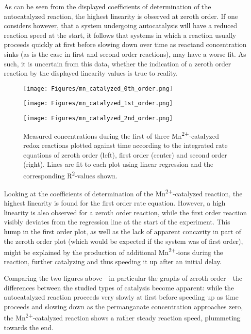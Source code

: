 \documentclass[titlepage]{article}
\begin{document}
%
\noindent As can be seen from the displayed coefficients of determination of the autocatalyzed reaction, the highest linearity is observed at zeroth order. If one considers however, that a system undergoing autocatalysis will have a reduced reaction speed at the start, it follows that systems in which a reaction usually proceeds quickly at first before slowing down over time as reactand concentration sinks (as is the case in first and second order reactions), may have a worse fit. As such, it is uncertain from this data, whether the indication of a zeroth order reaction by the displayed linearity values is true to reality.
%
\begin{figure}[H]
    \centering
    \begin{minipage}[c]{0.32\textwidth}
        \texttt{[image: Figures/mn\_catalyzed\_0th\_order.png]}
    \end{minipage}
    \begin{minipage}[c]{0.32\textwidth}
        \texttt{[image: Figures/mn\_catalyzed\_1st\_order.png]}
    \end{minipage}
    \begin{minipage}[c]{0.32\textwidth}
        \texttt{[image: Figures/mn\_catalyzed\_2nd\_order.png]}
    \end{minipage}
    \caption{Measured concentrations during the first of three Mn\textsuperscript{2+}-catalyzed redox reactions plotted against time according to the integrated rate equations of zeroth order (left), first order (center) and second order (right). Lines are fit to each plot using linear regression and the corresponding R\textsuperscript{2}-values shown.}
    \label{fig_kmno_mn_catalyzed_rates}
\end{figure}
%
\noindent Looking at the coefficients of determination of the Mn\textsuperscript{2+}-catalyzed reaction, the highest linearity is found for the first order rate equation. However, a high linearity is also observed for a zeroth order reaction, while the first order reaction visibly deviates from the regression line at the start of the experiment. This hump in the first order plot, as well as the lack of apparent concavity in part of the zeroth order plot (which would be expected if the system was of first order), might be explained by the production of additional Mn\textsuperscript{2+}-ions during the reaction, further catalyzing and thus speeding it up after an initial delay.

Comparing the two figures above - in particular the graphs of zeroth order - the differences between the studied types of catalysis become apparent: while the autocatalyzed reaction proceeds very slowly at first before speeding up as time proceeds and slowing down as the permanganate concentration approaches zero, the Mn\textsuperscript{2+}-catalyzed reaction shows a rather steady reaction speed, plummeting towards the end.
\end{document}
